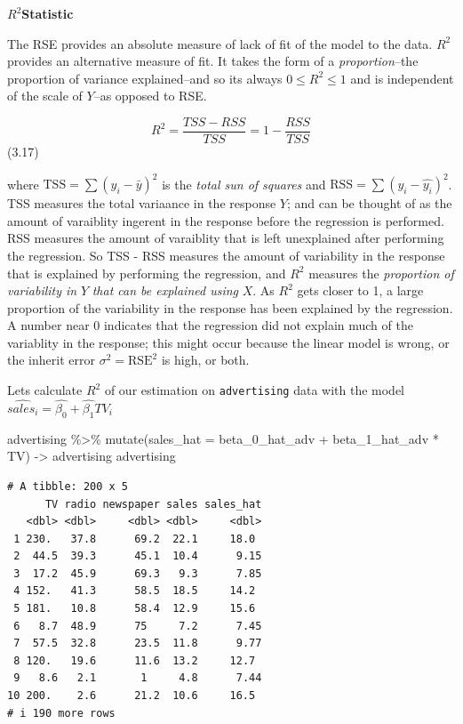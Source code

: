 \documentclass[
  letterpaper,
  DIV=11,
  numbers=noendperiod]{scrreprt}
\newenvironment{Shaded}{\begin{snugshade}}{\end{snugshade}}
\newcommand{\AttributeTok}[1]{\textcolor[rgb]{0.40,0.45,0.13}{#1}}
\newcommand{\FunctionTok}[1]{\textcolor[rgb]{0.28,0.35,0.67}{#1}}
\newcommand{\NormalTok}[1]{\textcolor[rgb]{0.00,0.23,0.31}{#1}}
\newcommand{\OtherTok}[1]{\textcolor[rgb]{0.00,0.23,0.31}{#1}}
\newcommand{\SpecialCharTok}[1]{\textcolor[rgb]{0.37,0.37,0.37}{#1}}
\begin{document}
\(R^2\)\textbf{Statistic}

The RSE provides an absolute measure of lack of fit of the model to the
data. \(R^2\) provides an alternative measure of fit. It takes the form
of a \emph{proportion}--the proportion of variance explained--and so its
always \(0\leq R^2 \leq 1\) and is independent of the scale of \(Y\)--as
opposed to RSE.

\[
R^2 = \frac{TSS - RSS}{TSS} = 1 - \frac{RSS}{TSS}
\] (3.17)

where \(\text{TSS} = \sum(y_i - \bar{y})^2\) is the \emph{total sun of
squares} and \(\text{RSS} = \sum(y_i - \hat{y_i})^2\). TSS measures the
total variaance in the response \(Y\); and can be thought of as the
amount of varaiblity ingerent in the response before the regression is
performed. RSS measures the amount of varaiblity that is left
unexplained after performing the regression. So TSS - RSS measures the
amount of variability in the response that is explained by performing
the regression, and \(R^2\) measures the \emph{proportion of variability
in} \(Y\) \emph{that can be explained using} \(X\). As \(R^2\) gets
closer to 1, a large proportion of the variability in the response has
been explained by the regression. A number near 0 indicates that the
regression did not explain much of the variablity in the response; this
might occur because the linear model is wrong, or the inherit error
\(\sigma^2 = \text{RSE}^2\) is high, or both.

Lets calculate \(R^2\) of our estimation on \texttt{advertising} data
with the model \(\hat{sales_i} = \hat{\beta_0} + \hat{\beta_1}TV_i\)

\begin{Shaded}
\begin{Highlighting}[]
\NormalTok{advertising }\SpecialCharTok{\%\textgreater{}\%} 
  \FunctionTok{mutate}\NormalTok{(}\AttributeTok{sales\_hat =}\NormalTok{ beta\_0\_hat\_adv }\SpecialCharTok{+}\NormalTok{ beta\_1\_hat\_adv }\SpecialCharTok{*}\NormalTok{ TV) }\OtherTok{{-}\textgreater{}}\NormalTok{ advertising}
\NormalTok{advertising}
\end{Highlighting}
\end{Shaded}

\begin{verbatim}
# A tibble: 200 x 5
      TV radio newspaper sales sales_hat
   <dbl> <dbl>     <dbl> <dbl>     <dbl>
 1 230.   37.8      69.2  22.1     18.0 
 2  44.5  39.3      45.1  10.4      9.15
 3  17.2  45.9      69.3   9.3      7.85
 4 152.   41.3      58.5  18.5     14.2 
 5 181.   10.8      58.4  12.9     15.6 
 6   8.7  48.9      75     7.2      7.45
 7  57.5  32.8      23.5  11.8      9.77
 8 120.   19.6      11.6  13.2     12.7 
 9   8.6   2.1       1     4.8      7.44
10 200.    2.6      21.2  10.6     16.5 
# i 190 more rows
\end{verbatim}
\end{document}
